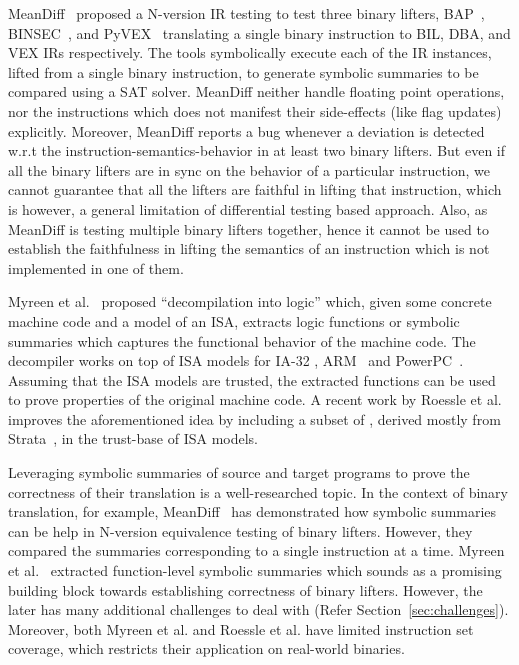 MeanDiff~\cite{ASE2017} proposed a N-version IR testing to test three binary
lifters, BAP~\cite{BAP:CAV11}, BINSEC~\cite{BINSEC2011}, and PyVEX~\cite{PYVEX}
translating a single binary instruction  to BIL, DBA, and VEX IRs respectively.
The tools symbolically execute each of the IR instances, lifted from a single
binary instruction, to generate symbolic summaries to be compared using a SAT
solver. MeanDiff neither handle floating point operations, nor the instructions
which does not manifest their side-effects (like flag updates) explicitly.
Moreover, MeanDiff reports a bug whenever a deviation is detected w.r.t the
instruction-semantics-behavior in at least two binary lifters. But even if all
the binary lifters are in sync on the behavior of a particular instruction, we
cannot guarantee that all the lifters are faithful in lifting that instruction,
       which is however, a general limitation of differential testing based
       approach. Also, as MeanDiff is testing multiple binary lifters
       together, hence it cannot be used to establish the faithfulness in
       lifting the semantics of an instruction which is not implemented in one
       of them.

Myreen et al.~\cite{Myreen:FMCAD:2008,Myreen:FMCAD:2012} proposed
``decompilation into logic'' which, given some concrete machine code and a
model of an ISA, extracts logic functions or symbolic summaries which captures
the functional behavior of the machine code. The decompiler works on top of ISA
models for IA-32 \cite{Karl2003}, ARM~\cite{Fox2003} and
PowerPC~\cite{Leroy:2006}. Assuming that the ISA models are trusted, the
extracted functions can be used to prove properties of the original machine
code. A recent work by Roessle et al.~\cite{Roessle:CPP19} improves the
aforementioned idea  by including a subset of \ISA, derived mostly from
Strata~\cite{Heule2016a}, in the trust-base of ISA models.   

Leveraging symbolic summaries of source and target programs to prove the
correctness of  their translation is a well-researched topic. In the context of
binary translation, for example, MeanDiff~\cite{ASE2017} has demonstrated how
symbolic summaries can be help in N-version equivalence testing of binary
lifters. However, they compared the summaries corresponding to a single
instruction at a time. Myreen et al.~\cite{Myreen:FMCAD:2008,Myreen:FMCAD:2012}
extracted function-level symbolic summaries which sounds as a promising
building block towards establishing correctness of binary  lifters. However,
         the later has many additional challenges to deal with (Refer
             Section~\ref{sec:challenges}). Moreover, both Myreen et al. and
         Roessle et al. have limited \ISA instruction set coverage, which
         restricts their application on real-world binaries.



